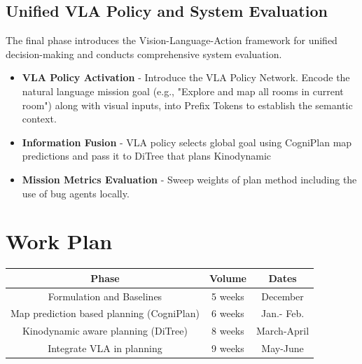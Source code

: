 \documentclass[12pt]{article}
\begin{document}
\subsection{Unified VLA Policy and System Evaluation}
The final phase introduces the Vision-Language-Action framework for unified decision-making and conducts comprehensive system evaluation.

\begin{itemize}
    \item \textbf{VLA Policy Activation} - Introduce the VLA Policy Network. Encode the natural language mission goal (e.g., "Explore and map all rooms in current room") along with visual inputs, into Prefix Tokens to establish the semantic context.
    \item \textbf{Information Fusion} - VLA policy selects global goal using CogniPlan map predictions and pass it to DiTree that plans Kinodynamic  
    \item \textbf{Mission  Metrics Evaluation} - Sweep weights of plan method including the use of bug agents locally.
\end{itemize}

\section{Work Plan}

\begin{center}
\begin{tabular}{|c|c|c|}
\hline
\textbf{Phase} & \textbf{Volume} & \textbf{Dates} \\ \hline\hline
Formulation and Baselines & 5 weeks & December \\ \hline
Map prediction based planning (CogniPlan) &  6 weeks & Jan.- Feb. \\ \hline
Kinodynamic aware planning (DiTree) & 8 weeks & March-April \\ \hline
 Integrate VLA in planning & 9 weeks & May-June \\ \hline
\end{tabular}
\end{center}

\printbibliography
\end{document}
